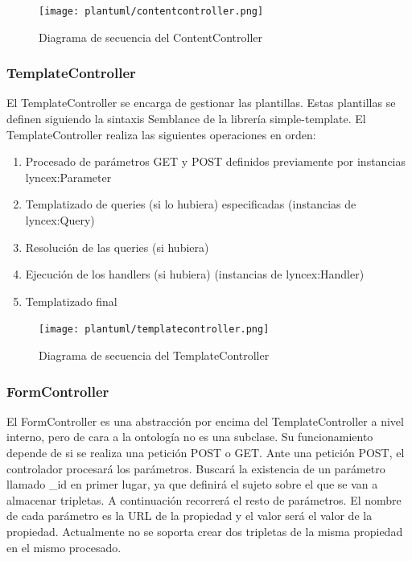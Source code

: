 \documentclass[12pt]{report} %
\begin{document}
\begin{figure}[h]
    \centering
    \texttt{[image: plantuml/contentcontroller.png]}
    \caption{Diagrama de secuencia del ContentController}
    \label{fig:contentcontroller}
\end{figure}

\subsubsection{TemplateController}
El TemplateController se encarga de gestionar las plantillas. Estas plantillas se definen siguiendo la sintaxis Semblance de la librería simple-template.
El TemplateController realiza las siguientes operaciones en orden:
\begin{enumerate}
    \item Procesado de parámetros GET y POST definidos previamente por instancias lyncex:Parameter
    \item Templatizado de queries (si lo hubiera) especificadas (instancias de lyncex:Query)
    \item Resolución de las queries (si hubiera)
    \item Ejecución de los handlers (si hubiera) (instancias de lyncex:Handler)
    \item Templatizado final
\end{enumerate}

\begin{figure}[h]
    \centering
    \texttt{[image: plantuml/templatecontroller.png]}
    \caption{Diagrama de secuencia del TemplateController}
    \label{fig:templatecontroller}
\end{figure}

\subsubsection{FormController}
El FormController es una abstracción por encima del TemplateController a nivel interno, pero de cara a la ontología no es una subclase.
Su funcionamiento depende de si se realiza una petición POST o GET. Ante una petición POST, el controlador procesará los parámetros.
Buscará la existencia de un parámetro llamado \_id en primer lugar, ya que definirá el sujeto sobre el que se van a almacenar tripletas.
A continuación recorrerá el resto de parámetros. El nombre de cada parámetro es la URL de la propiedad y el valor será el valor de la propiedad.
Actualmente no se soporta crear dos tripletas de la misma propiedad en el mismo procesado.
\end{document}
